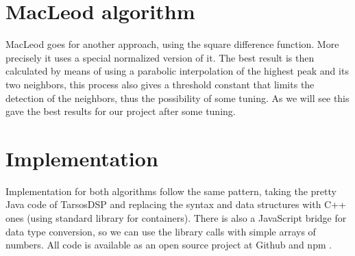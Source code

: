 \section{MacLeod algorithm}
MacLeod \cite{MacLeodArticle} goes for another approach, using the square difference
function. More precisely it uses a special normalized version of it. The best result
is then calculated by means of using a parabolic interpolation of the highest
peak and its two neighbors, this process also gives a threshold constant that limits
the detection of the neighbors, thus the possibility of some tuning. As we will
see this gave the best results for our project after some tuning.

\section{Implementation}
Implementation for both algorithms follow the same pattern, taking the pretty
Java code of TarsosDSP \cite{TarsosDSP} and replacing the syntax and data structures
with C++ ones (using standard library for containers). There is also a JavaScript bridge
for data type conversion, so we can use the library calls with simple arrays of numbers.
All code is available as an open source project at Github and npm \cite{node-pitchfinder}.
